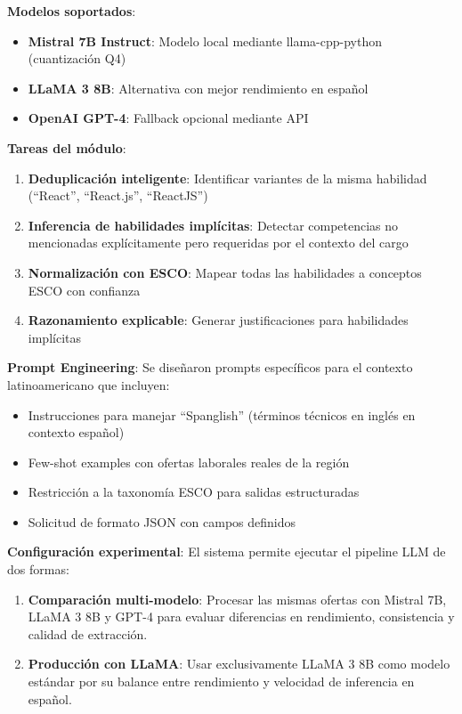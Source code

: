 \textbf{Modelos soportados}:
\begin{itemize}
    \item \textbf{Mistral 7B Instruct}: Modelo local mediante llama-cpp-python (cuantización Q4)
    \item \textbf{LLaMA 3 8B}: Alternativa con mejor rendimiento en español
    \item \textbf{OpenAI GPT-4}: Fallback opcional mediante API
\end{itemize}

\textbf{Tareas del módulo}:
\begin{enumerate}
    \item \textbf{Deduplicación inteligente}: Identificar variantes de la misma habilidad (``React'', ``React.js'', ``ReactJS'')
    \item \textbf{Inferencia de habilidades implícitas}: Detectar competencias no mencionadas explícitamente pero requeridas por el contexto del cargo
    \item \textbf{Normalización con ESCO}: Mapear todas las habilidades a conceptos ESCO con confianza
    \item \textbf{Razonamiento explicable}: Generar justificaciones para habilidades implícitas
\end{enumerate}

\textbf{Prompt Engineering}: Se diseñaron prompts específicos para el contexto latinoamericano que incluyen:
\begin{itemize}
    \item Instrucciones para manejar ``Spanglish'' (términos técnicos en inglés en contexto español)
    \item Few-shot examples con ofertas laborales reales de la región
    \item Restricción a la taxonomía ESCO para salidas estructuradas
    \item Solicitud de formato JSON con campos definidos
\end{itemize}

\textbf{Configuración experimental}: El sistema permite ejecutar el pipeline LLM de dos formas:
\begin{enumerate}
    \item \textbf{Comparación multi-modelo}: Procesar las mismas ofertas con Mistral 7B, LLaMA 3 8B y GPT-4 para evaluar diferencias en rendimiento, consistencia y calidad de extracción.
    \item \textbf{Producción con LLaMA}: Usar exclusivamente LLaMA 3 8B como modelo estándar por su balance entre rendimiento y velocidad de inferencia en español.
\end{enumerate}

